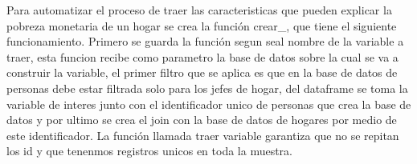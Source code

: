 \documentclass[
]{article}
\newenvironment{Shaded}{\begin{snugshade}}{\end{snugshade}}
\newcommand{\AttributeTok}[1]{\textcolor[rgb]{0.13,0.29,0.53}{#1}}
\newcommand{\ControlFlowTok}[1]{\textcolor[rgb]{0.13,0.29,0.53}{\textbf{#1}}}
\newcommand{\DecValTok}[1]{\textcolor[rgb]{0.00,0.00,0.81}{#1}}
\newcommand{\FunctionTok}[1]{\textcolor[rgb]{0.13,0.29,0.53}{\textbf{#1}}}
\newcommand{\NormalTok}[1]{#1}
\newcommand{\OtherTok}[1]{\textcolor[rgb]{0.56,0.35,0.01}{#1}}
\newcommand{\SpecialCharTok}[1]{\textcolor[rgb]{0.81,0.36,0.00}{\textbf{#1}}}
\newcommand{\StringTok}[1]{\textcolor[rgb]{0.31,0.60,0.02}{#1}}
\begin{document}
Para automatizar el proceso de traer las caracteristicas que pueden
explicar la pobreza monetaria de un hogar se crea la función crear\_,
que tiene el siguiente funcionamiento. Primero se guarda la función
segun seal nombre de la variable a traer, esta funcion recibe como
parametro la base de datos sobre la cual se va a construir la variable,
el primer filtro que se aplica es que en la base de datos de personas
debe estar filtrada solo para los jefes de hogar, del dataframe se toma
la variable de interes junto con el identificador unico de personas que
crea la base de datos y por ultimo se crea el join con la base de datos
de hogares por medio de este identificador. La función llamada traer
variable garantiza que no se repitan los id y que tenenmos registros
unicos en toda la muestra.

\begin{Shaded}
\end{Shaded}
\end{document}
